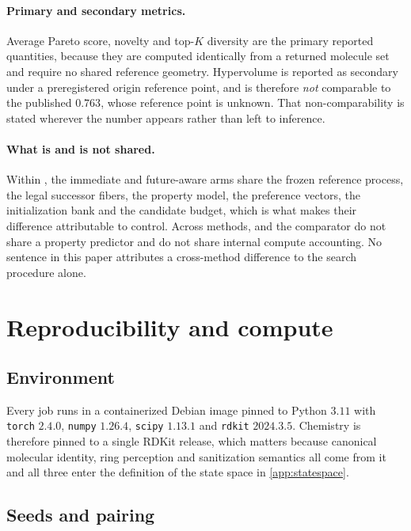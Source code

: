\paragraph{Primary and secondary metrics.}
Average Pareto score, novelty and top-$K$ diversity are the primary reported quantities, because they are computed identically from a returned molecule set and require no shared reference geometry. Hypervolume is reported as secondary under a preregistered origin reference point, and is therefore \emph{not} comparable to the published $0.763$, whose reference point is unknown. That non-comparability is stated wherever the number appears rather than left to inference.

\paragraph{What is and is not shared.}
Within \method{}, the immediate and future-aware arms share the frozen reference process, the legal successor fibers, the property model, the preference vectors, the initialization bank and the candidate budget, which is what makes their difference attributable to control. Across methods, \method{} and the comparator do not share a property predictor and do not share internal compute accounting. No sentence in this paper attributes a cross-method difference to the search procedure alone.

\section{Reproducibility and compute}
\label{app:repro}

\subsection{Environment}

Every job runs in a containerized Debian image pinned to Python $3.11$ with \texttt{torch} $2.4.0$, \texttt{numpy} $1.26.4$, \texttt{scipy} $1.13.1$ and \texttt{rdkit} $2024.3.5$. Chemistry is therefore pinned to a single RDKit release, which matters because canonical molecular identity, ring perception and sanitization semantics all come from it and all three enter the definition of the state space in \cref{app:statespace}.

\subsection{Seeds and pairing}

